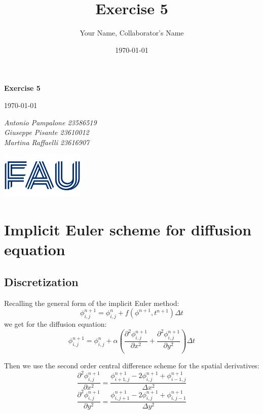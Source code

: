 \documentclass{article}
\title{Exercise 5}
\author{Your Name, Collaborator's Name}
\date{\today}
\begin{document}
\begin{titlepage}
    \centering
    \vspace*{1in}
    
    {\Huge\bfseries Exercise 5\par}
    \vspace{1.5cm}
    {\Large \today\par}
    \vspace{1.5cm}
    {\Large\itshape Antonio Pampalone 23586519 \\ Giuseppe Pisante 23610012\\ Martina Raffaelli 23616907 \par}
    
    \vfill
    \includegraphics[width=0.3\textwidth]{FAU-Logo.png}\par\vspace{1cm} %
   
\end{titlepage}

\newpage
\small
\section{Implicit Euler scheme for diffusion equation}
\subsection{Discretization}
Recalling the general form of the implicit Euler method:
\begin{equation*}
  \phi^{n+1}_{i,j} = \phi^{n}_{i,j} + f(\phi^{n+1}, t^{n+1}) \Delta t 
\end{equation*}
we get for the diffusion equation:
\begin{equation*}
  \phi^{n+1}_{i,j} = \phi^{n}_{i,j} + \alpha (\frac{\partial^2 \phi^{n+1}_{i,j}}{\partial x^2} + \frac{\partial^2 \phi^{n+1}_{i,j}}{\partial y^2}) \Delta t
\end{equation*}

Then we use the second order central difference scheme for the spatial derivatives:
\begin{equation*}
  \frac{\partial^2 \phi^{n+1}_{i,j}}{\partial x^2} = \frac{\phi^{n+1}_{i+1,j} - 2\phi^{n+1}_{i,j} + \phi^{n+1}_{i-1,j}}{\Delta x^2}
\end{equation*}
\begin{equation*}
  \frac{\partial^2 \phi^{n+1}_{i,j}}{\partial y^2} = \frac{\phi^{n+1}_{i,j+1} - 2\phi^{n+1}_{i,j} + \phi^{n+1}_{i,j-1}}{\Delta y^2}
\end{equation*}
\end{document}
